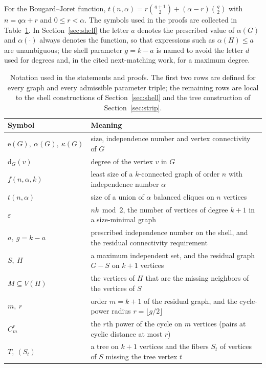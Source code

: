 \documentclass[11pt]{article}
\theoremstyle{remark}
\newcommand{\dd}{\mathrm{d}}
\newcommand{\e}{\mathrm{e}}
\begin{document}
For the Bougard--Joret function, $t(n,\alpha)=r\binom{q+1}{2}+(\alpha-r)\binom q2$ with $n=q\alpha+r$ and $0\le r<\alpha$.
The symbols used in the proofs are collected in Table~\ref{tab:notation}.
In Section~\ref{sec:shell} the letter $a$ denotes the prescribed value of $\alpha(G)$ and $\alpha(\cdot)$ always denotes the function, so that expressions such as $\alpha(H)\le a$ are unambiguous; the shell parameter $g=k-a$ is named to avoid the letter $d$ used for degrees and, in the cited next-matching work, for a maximum degree.

\begin{table}[ht]
\centering\small
\begin{tabular}{lp{}}
\toprule
Symbol & Meaning\\
\midrule
$\e(G),\ \alpha(G),\ \kappa(G)$ & size, independence number and vertex connectivity of $G$\\
$\dd_G(v)$ & degree of the vertex $v$ in $G$\\
$f(n,\alpha,k)$ & least size of a $k$-connected graph of order $n$ with independence number $\alpha$\\
$t(n,\alpha)$ & size of a union of $\alpha$ balanced cliques on $n$ vertices\\
$\varepsilon$ & $nk\bmod2$, the number of vertices of degree $k+1$ in a size-minimal graph\\
$a,\ g=k-a$ & prescribed independence number on the shell, and the residual connectivity requirement\\
$S,\ H$ & a maximum independent set, and the residual graph $G-S$ on $k+1$ vertices\\
$M\subseteq V(H)$ & the vertices of $H$ that are the missing neighbors of the vertices of $S$\\
$m,\ r$ & order $m=k+1$ of the residual graph, and the cycle-power radius $r=\lfloor g/2\rfloor$\\
$C_m^r$ & the $r$th power of the cycle on $m$ vertices (pairs at cyclic distance at most $r$)\\
$T,\ (S_t)$ & a tree on $k+1$ vertices and the fibers $S_t$ of vertices of $S$ missing the tree vertex $t$\\
\bottomrule
\end{tabular}
\caption{Notation used in the statements and proofs. The first two rows are defined for every graph and every admissible parameter triple; the remaining rows are local to the shell constructions of Section~\ref{sec:shell} and the tree construction of Section~\ref{sec:strip}.}
\label{tab:notation}
\end{table}
\end{document}
